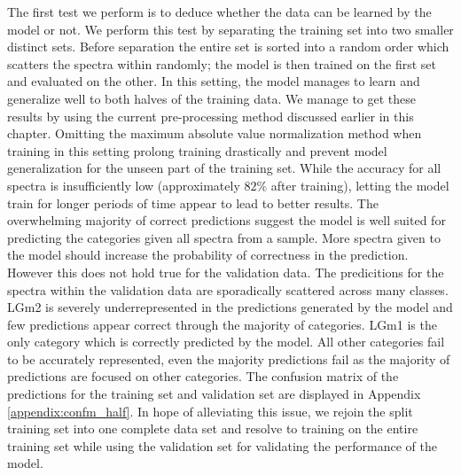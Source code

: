 The first test we perform is to deduce whether the data can be learned by the model or not. We perform this test by separating the training set into two smaller distinct sets. Before separation the entire set is sorted into a random order which scatters the spectra within randomly; the model is then trained on the first set and evaluated on the other. In this setting, the model manages to learn and generalize well to both halves of the training data. We manage to get these results by using the current pre-processing method discussed earlier in this chapter. Omitting the maximum absolute value normalization method when training in this setting prolong training drastically and prevent model generalization for the unseen part of the training set. While the accuracy for all spectra is insufficiently low (approximately $82\%$ after training), letting the model train for longer periods of time appear to lead to better results. The overwhelming majority of correct predictions suggest the model is well suited for predicting the categories given all spectra from a sample. More spectra given to the model should increase the probability of correctness in the prediction. However this does not hold true for the validation data. The predicitions for the spectra within the validation data are sporadically scattered across many classes. LGm2 is severely underrepresented in the predictions generated by the model and few predictions appear correct through the majority of categories. LGm1 is the only category which is correctly predicted by the model. All other categories fail to be accurately represented, even the majority predictions fail as the majority of predictions are focused on other categories. The confusion matrix of the predictions for the training set and validation set are displayed in Appendix \ref{appendix:confm_half}. In hope of alleviating this issue, we rejoin the split training set into one complete data set and resolve to training on the entire training set while using the validation set for validating the performance of the model.

